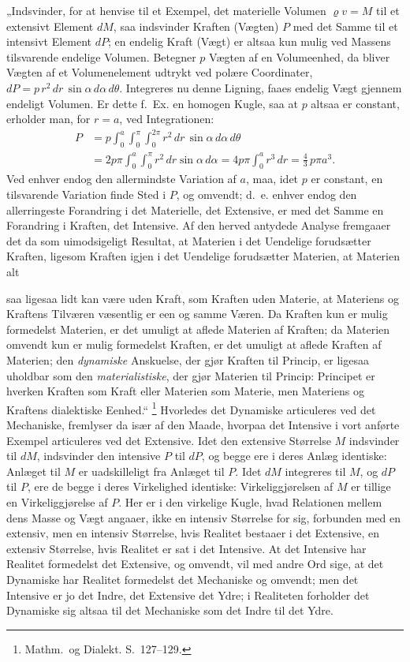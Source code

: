 \documentclass[12pt]{book}
\newcommand{\opage}[1]{\marginnote{\footnotesize\textit{[#1]}}}
\begin{document}
„Indsvinder, for at henvise til et Exempel, det materielle Volumen $\varrho v = M$ til et
extensivt Element $dM$, saa indsvinder Kraften (Vægten) $P$ med det Samme til et intensivt
Element $dP$; en endelig Kraft (Vægt) er altsaa kun mulig ved Massens tilsvarende endelige
Volumen. Betegner $p$ Vægten af en Volumeenhed, da bliver Vægten af et Volumenelement
udtrykt ved polære Coordinater, $dP = p\,r^{2}\,dr\,\sin\alpha\,d\alpha\,d\theta$.
Integreres nu denne Ligning, faaes endelig Vægt gjennem endeligt Volumen. Er dette f.\ Ex.
en homogen Kugle, saa at $p$ altsaa er constant, erholder man, for $r = a$, ved
Integrationen:
\[ \begin{aligned}
P &= p \int_{0}^{a}\!\!\int_{0}^{\pi}\!\!\int_{0}^{2\pi} r^{2}\,dr\,\sin\alpha\,d\alpha\,d\theta\\
&= 2p\pi \int_{0}^{a}\!\!\int_{0}^{\pi} r^{2}\,dr\sin\alpha\,d\alpha
   = 4p\pi \int_{0}^{a} r^{3}\,dr = \tfrac{4}{3}\,p\pi a^{3}.
\end{aligned} \]
Ved enhver endog den allermindste Variation af $a$, maa, idet $p$ er constant, en
tilsvarende Variation finde Sted i $P$, og omvendt; d.\ e. enhver endog den allerringeste
Forandring i det Materielle, det Extensive, er med det Samme en Forandring i Kraften, det
Intensive. Af den herved antydede Analyse fremgaaer det da som uimodsigeligt Resultat, at
Materien i det Uendelige forudsætter Kraften, ligesom Kraften igjen i det Uendelige
forudsætter Materien, at Materien alt\-%

\opage{365} saa ligesaa lidt kan være uden Kraft, som Kraften uden Materie, at Materiens og Kraftens
Tilværen væsentlig er een og samme Væren. Da Kraften kun er mulig formedelst Materien, er
det umuligt at aflede Materien af Kraften; da Materien omvendt kun er mulig formedelst
Kraften, er det umuligt at aflede Kraften af Materien; den \emph{dynamiske} Anskuelse, der
gjør Kraften til Princip, er ligesaa uholdbar som den \emph{materialistiske}, der gjør
Materien til Princip: Principet er hverken Kraften som Kraft eller Materien som Materie, men
Materiens og Kraftens dialektiske Eenhed.“%
\footnote{Mathm.\ og Dialekt. S.~127--129.}
Hvorledes det Dynamiske articuleres ved det Mechaniske, fremlyser da især af den Maade,
hvorpaa det Intensive i vort anførte Exempel articuleres ved det Extensive. Idet den
extensive Størrelse $M$ indsvinder til $dM$, indsvinder den intensive $P$ til $dP$, og
begge ere i deres Anlæg identiske: Anlæget til $M$ er uadskilleligt fra Anlæget til $P$.
Idet $dM$ integreres til $M$, og $dP$ til $P$, ere de begge i deres Virkelighed identiske:
Virkeliggjørelsen af $M$ er tillige en Virkeliggjørelse af $P$. Her er i den virkelige
Kugle, hvad Relationen mellem dens Masse og Vægt angaaer, ikke en intensiv Størrelse for
sig, forbunden med en extensiv, men en intensiv Størrelse, hvis Realitet bestaaer i det
Extensive, en extensiv Størrelse, hvis Realitet er sat i det Intensive. At det Intensive har
Realitet formedelst det Extensive, og omvendt, vil med andre Ord sige, at det Dynamiske har
Realitet formedelst det Mechaniske og omvendt; men det Intensive er jo det Indre, det
Extensive det Ydre; i Realiteten forholder det Dynamiske sig altsaa til det Mechaniske som
det Indre til det Ydre.
\end{document}

